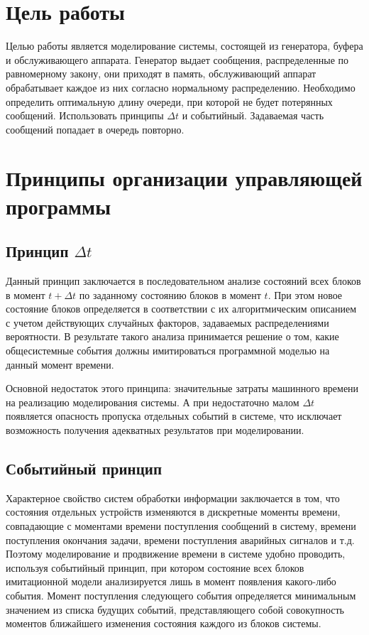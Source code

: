 \section*{Цель работы}

Целью работы  является моделирование системы, состоящей из генератора, буфера и
обслуживающего аппарата. Генератор выдает сообщения, распределенные по
равномерному закону, они приходят в память, обслуживающий аппарат обрабатывает
каждое из них согласно нормальному распределению. Необходимо определить
оптимальную длину очереди, при которой не будет потерянных сообщений.
Использовать принципы $\Delta t$ и событийный. Задаваемая часть сообщений
попадает в очередь повторно.

\section*{Принципы организации управляющей программы}
\vspace{-1\baselineskip}
\subsection*{Принцип $\Delta t$}

Данный принцип заключается в последовательном анализе состояний всех блоков в
момент $t + \Delta t$ по заданному состоянию блоков в момент $t$. При этом
новое состояние блоков определяется в соответствии с их алгоритмическим
описанием с учетом действующих случайных факторов, задаваемых распределениями
вероятности. В результате такого анализа принимается решение о том, какие
общесистемные события должны имитироваться программной моделью на данный момент
времени.

Основной недостаток этого принципа: значительные затраты машинного времени на
реализацию моделирования системы. А при недостаточно малом $\Delta t$
появляется опасность пропуска отдельных событий в системе, что исключает
возможность получения адекватных результатов при моделировании.

\subsection*{Событийный принцип}

Характерное свойство систем обработки информации заключается в том, что
состояния отдельных устройств изменяются в дискретные моменты времени,
совпадающие с моментами времени поступления сообщений в систему, времени
поступления окончания задачи, времени поступления аварийных сигналов и т.д.
Поэтому моделирование и продвижение времени в системе удобно проводить,
используя событийный принцип, при котором состояние всех блоков имитационной
модели анализируется лишь в момент появления какого-либо события. Момент
поступления следующего события определяется минимальным значением из списка
будущих событий, представляющего собой совокупность моментов ближайшего
изменения состояния каждого из блоков системы.

